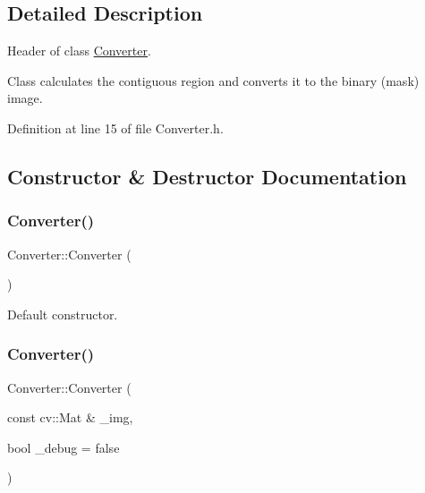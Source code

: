 \subsection{Detailed Description}
Header of class \mbox{\hyperlink{class_converter}{Converter}}. 

Class calculates the contiguous region and converts it to the binary (mask) image. 

Definition at line 15 of file Converter.\+h.



\subsection{Constructor \& Destructor Documentation}
\mbox{\label{class_converter_aaa67c7d2770c60fc2fa85fccb6f8a1fc}} 
\subsubsection{\texorpdfstring{Converter()}{Converter()}\hspace{0.1cm}{\footnotesize\ttfamily [1/2]}}
{\footnotesize\ttfamily Converter\+::\+Converter (\begin{DoxyParamCaption}{ }\end{DoxyParamCaption})\hspace{0.3cm}{\ttfamily [default]}}



Default constructor. 

\mbox{\label{class_converter_ae1915b3a733528dc6a99582de4e9c8bb}} 
\subsubsection{\texorpdfstring{Converter()}{Converter()}\hspace{0.1cm}{\footnotesize\ttfamily [2/2]}}
{\footnotesize\ttfamily Converter\+::\+Converter (\begin{DoxyParamCaption}\item[{const cv\+::\+Mat \&}]{\+\_\+img,  }\item[{bool}]{\+\_\+debug = {\ttfamily false} }\end{DoxyParamCaption})}



